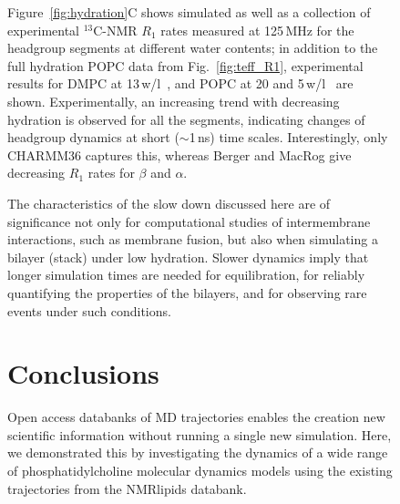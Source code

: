 \documentclass[journal=jcisd8,manuscript=article,layout=twocolumn]{achemso}
\begin{document}
\begin{figure}[h!]


Figure~\ref{fig:hydration}C shows simulated as well as 
a collection of experimental $^{13}$C-NMR $R_1$ rates
measured at 125\,MHz for the headgroup segments
at different water contents;
in addition to the full hydration POPC data from Fig.~\ref{fig:teff_R1},
experimental results for DMPC at 13\,w/l~\cite{pham15}, %
and POPC at 20 and 5\,w/l~\cite{Volke:1995a} %
are shown.
%
Experimentally, an increasing trend with decreasing hydration is observed for all the segments,
indicating changes of headgroup dynamics at short ($\sim$1\,ns) time scales.
Interestingly, only CHARMM36 captures this,
whereas Berger and MacRog give decreasing $R_1$ rates for $\beta$ and $\alpha$.
%

The characteristics of the slow down discussed here are of significance
not only for computational studies of inter\-membrane interactions, such as membrane fusion,  but also when simulating a bilayer (stack) under low hydration. Slower dynamics imply that longer simulation times are needed for equilibration, for reliably quantifying the properties of the bilayers, and for observing rare events under such conditions. %


\section{Conclusions}
Open access databanks of MD trajectories enables the creation new scientific information without running a single new simulation. Here,
we demonstrated this by investigating the dynamics of a wide range of phosphatidylcholine molecular dynamics models using the existing trajectories from the NMRlipids databank.


\end{figure}
\end{document}
